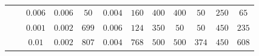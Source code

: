 \begin{table}
\begin{tabulary}{\linewidth}{C|c|C|C|C|C|C|C|C|C|C|C}
		 &  & $0.006$ & $0.006$ & $50$ & $0.004$ & $160$ & $400$ & $400$ & $50$ & $250$ & $65$ \\
		&  & $0.001$ & $0.002$ & $699$ & $0.006$ & $124$ & $350$ & $50$ & $50$ & $450$ & $235$ \\
		&  & $0.01$ & $0.002$ & $807$ & $0.004$ & $768$ & $500$ & $500$ & $374$ & $450$ & $608$ \\\hline
	\end{tabulary}
\end{table}
